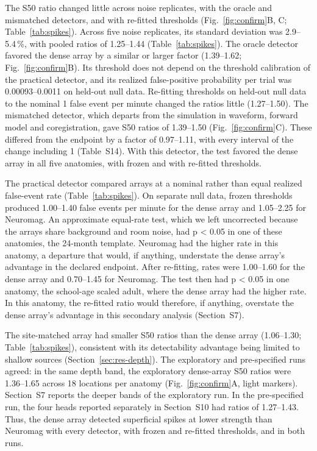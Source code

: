 \documentclass[preprint,12pt,authoryear,a4paper]{elsarticle}
\begin{document}
The S50 ratio changed little across noise replicates, with the oracle and mismatched detectors, and with re-fitted thresholds (Fig.~\ref{fig:confirm}B, C; Table~\ref{tab:spikes}). Across five noise replicates, its standard deviation was 2.9–5.4\,\%, with pooled ratios of 1.25–1.44 (Table~\ref{tab:spikes}). The oracle detector favored the dense array by a similar or larger factor (1.39–1.62; Fig.~\ref{fig:confirm}B). Its threshold does not depend on the threshold calibration of the practical detector, and its realized false-positive probability per trial was 0.00093–0.0011 on held-out null data. Re-fitting thresholds on held-out null data to the nominal 1 false event per minute changed the ratios little (1.27–1.50). The mismatched detector, which departs from the simulation in waveform, forward model and coregistration, gave S50 ratios of 1.39–1.50 (Fig.~\ref{fig:confirm}C). These differed from the endpoint by a factor of 0.97–1.11, with every interval of the change including 1 (Table~S14). With this detector, the test favored the dense array in all five anatomies, with frozen and with re-fitted thresholds.

The practical detector compared arrays at a nominal rather than equal realized false-event rate (Table~\ref{tab:spikes}). On separate null data, frozen thresholds produced 1.00–1.40 false events per minute for the dense array and 1.05–2.25 for Neuromag. An approximate equal-rate test, which we left uncorrected because the arrays share background and room noise, had p < 0.05 in one of these anatomies, the 24-month template. Neuromag had the higher rate in this anatomy, a departure that would, if anything, understate the dense array's advantage in the declared endpoint. After re-fitting, rates were 1.00–1.60 for the dense array and 0.70–1.45 for Neuromag. The test then had p < 0.05 in one anatomy, the school-age scaled adult, where the dense array had the higher rate. In this anatomy, the re-fitted ratio would therefore, if anything, overstate the dense array's advantage in this secondary analysis (Section~S7).

The site-matched array had smaller S50 ratios than the dense array (1.06–1.30; Table~\ref{tab:spikes}), consistent with its detectability advantage being limited to shallow sources (Section~\ref{sec:res-depth}). The exploratory and pre-specified runs agreed: in the same depth band, the exploratory dense-array S50 ratios were 1.36–1.65 across 18 locations per anatomy (Fig.~\ref{fig:confirm}A, light markers). Section~S7 reports the deeper bands of the exploratory run. In the pre-specified run, the four heads reported separately in Section~S10 had ratios of 1.27–1.43. Thus, the dense array detected superficial spikes at lower strength than Neuromag with every detector, with frozen and re-fitted thresholds, and in both runs.
\end{document}
